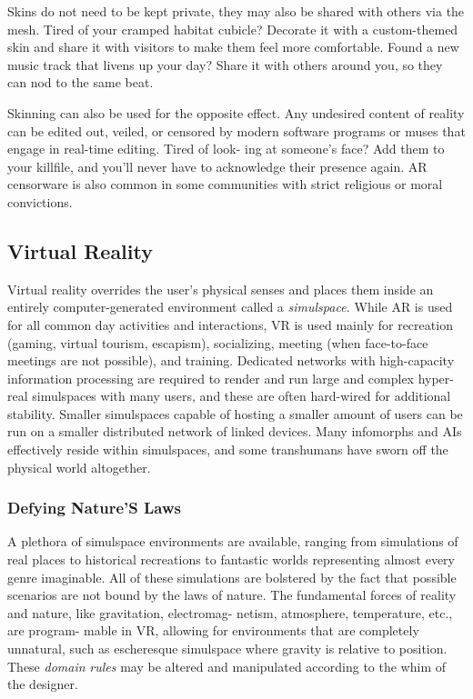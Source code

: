 Skins do not need to be kept private, they may 
also be shared with others via the mesh. Tired of 
your cramped habitat cubicle? Decorate it with a 
custom-themed skin and share it with visitors to make 
them feel more comfortable. Found a new music track 
that livens up your day? Share it with others around 
you, so they can nod to the same beat.

Skinning can also be used for the opposite effect. 
Any undesired content of reality can be edited out, 
veiled, or censored by modern software programs or 
muses that engage in real-time editing. Tired of look-
ing at someone's face? Add them to your killfile, and 
you'll never have to acknowledge their presence again. 
AR censorware is also common in some communities 
with strict religious or moral convictions.

\subsection{Virtual Reality}

Virtual reality overrides the user's physical senses and 
places them inside an entirely computer-generated 
environment called a \textit{simulspace.} While AR is used 
for all common day activities and interactions, VR is 
used mainly for recreation (gaming, virtual tourism, 
escapism), socializing, meeting (when face-to-face 
meetings are not possible), and training. Dedicated 
networks with high-capacity information processing 
are required to render and run large and complex 
hyper-real simulspaces with many users, and these 
are often hard-wired for additional stability. Smaller 
simulspaces capable of hosting a smaller amount of 
users can be run on a smaller distributed network of 
linked devices. Many infomorphs and AIs effectively 
reside within simulspaces, and some transhumans 
have sworn off the physical world altogether.

\subsubsection{Defying Nature'S Laws}

A plethora of simulspace environments are available, 
ranging from simulations of real places to historical 
recreations to fantastic worlds representing almost 
every genre imaginable. All of these simulations are 
bolstered by the fact that possible scenarios are not 
bound by the laws of nature. The fundamental forces 
of reality and nature, like gravitation, electromag-
netism, atmosphere, temperature, etc., are program-
mable in VR, allowing for environments that are 
completely unnatural, such as escheresque simulspace 
where gravity is relative to position. These \textit{domain }
\textit{rules} may be altered and manipulated according to 
the whim of the designer.

